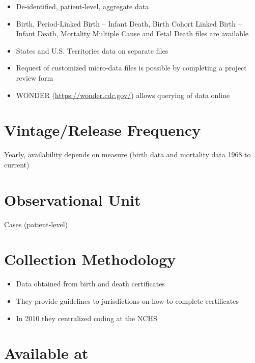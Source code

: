 \documentclass[
]{book}
\providecommand{\tightlist}{%
  \setlength{\itemsep}{0pt}\setlength{\parskip}{0pt}}
\begin{document}
\begin{itemize}
\tightlist
\item
  De-identified, patient-level, aggregate data
\item
  Birth, Period-Linked Birth -- Infant Death, Birth Cohort Linked Birth -- Infant Death, Mortality Multiple Cause and Fetal Death files are available
\item
  States and U.S. Territories data on separate files
\item
  Request of customized micro-data files is possible by completing a project review form
\item
  WONDER (\url{https://wonder.cdc.gov/}) allows querying of data online
\end{itemize}

\hypertarget{vintagerelease-frequency-66}{%
\section{Vintage/Release Frequency}\label{vintagerelease-frequency-66}}

Yearly, availability depends on measure (birth data and mortality data 1968 to current)

\hypertarget{observational-unit-66}{%
\section{Observational Unit}\label{observational-unit-66}}

Cases (patient-level)

\hypertarget{collection-methodology-66}{%
\section{Collection Methodology}\label{collection-methodology-66}}

\begin{itemize}
\tightlist
\item
  Data obtained from birth and death certificates
\item
  They provide guidelines to jurisdictions on how to complete certificates
\item
  In 2010 they centralized coding at the NCHS
\end{itemize}

\hypertarget{available-at-66}{%
\section{Available at}\label{available-at-66}}
\end{document}
